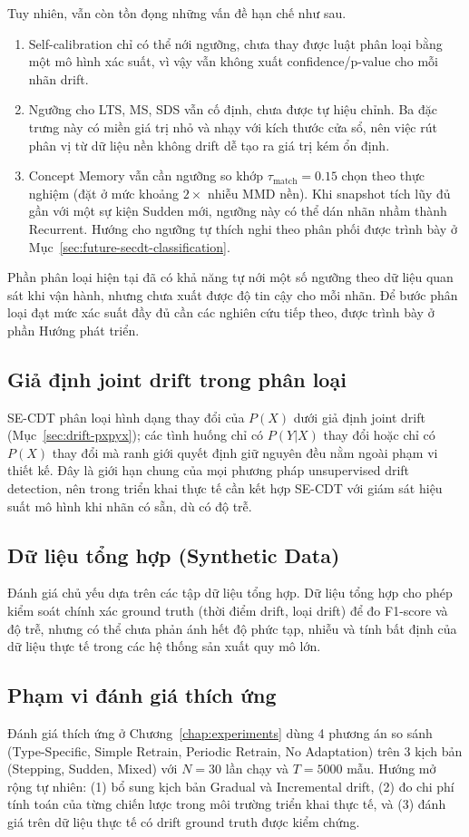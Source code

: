 Tuy nhiên, vẫn còn tồn đọng những vấn đề hạn chế như sau.
\begin{enumerate}
	\item Self-calibration chỉ có thể nới ngưỡng, chưa thay được luật phân loại bằng một mô hình xác suất, vì vậy vẫn không xuất confidence/p-value cho mỗi nhãn drift.
	\item Ngưỡng cho LTS, MS, SDS vẫn cố định, chưa được tự hiệu chỉnh. Ba đặc trưng này có miền giá trị nhỏ và nhạy với kích thước cửa sổ, nên việc rút phân vị từ dữ liệu nền không drift dễ tạo ra giá trị kém ổn định.
	\item Concept Memory vẫn cần ngưỡng so khớp $\tau_{\text{match}} = 0.15$ chọn theo thực nghiệm (đặt ở mức khoảng $2\times$ nhiễu MMD nền). Khi snapshot tích lũy đủ gần với một sự kiện Sudden mới, ngưỡng này có thể dán nhãn nhầm thành Recurrent. Hướng cho ngưỡng tự thích nghi theo phân phối được trình bày ở Mục~\ref{sec:future-secdt-classification}.
\end{enumerate}
Phần phân loại hiện tại đã có khả năng tự nới một số ngưỡng theo dữ liệu quan sát khi vận hành, nhưng chưa xuất được độ tin cậy cho mỗi nhãn. Để bước phân loại đạt mức xác suất đầy đủ cần các nghiên cứu tiếp theo, được trình bày ở phần Hướng phát triển.

\subsection{Giả định joint drift trong phân loại}
\label{sec:limitation-joint-drift}
SE-CDT phân loại hình dạng thay đổi của $P(X)$ dưới giả định joint drift (Mục~\ref{sec:drift-pxpyx}); các tình huống chỉ có $P(Y|X)$ thay đổi hoặc chỉ có $P(X)$ thay đổi mà ranh giới quyết định giữ nguyên đều nằm ngoài phạm vi thiết kế. Đây là giới hạn chung của mọi phương pháp unsupervised drift detection, nên trong triển khai thực tế cần kết hợp SE-CDT với giám sát hiệu suất mô hình khi nhãn có sẵn, dù có độ trễ.

\subsection{Dữ liệu tổng hợp (Synthetic Data)}
Đánh giá chủ yếu dựa trên các tập dữ liệu tổng hợp. Dữ liệu tổng hợp cho phép kiểm soát chính xác ground truth (thời điểm drift, loại drift) để đo F1-score và độ trễ, nhưng có thể chưa phản ánh hết độ phức tạp, nhiễu và tính bất định của dữ liệu thực tế trong các hệ thống sản xuất quy mô lớn.

\subsection{Phạm vi đánh giá thích ứng}
Đánh giá thích ứng ở Chương~\ref{chap:experiments} dùng 4 phương án so sánh (Type-Specific, Simple Retrain, Periodic Retrain, No Adaptation) trên 3 kịch bản (Stepping, Sudden, Mixed) với $N = 30$ lần chạy và $T = 5000$ mẫu. Hướng mở rộng tự nhiên: (1) bổ sung kịch bản Gradual và Incremental drift, (2) đo chi phí tính toán của từng chiến lược trong môi trường triển khai thực tế, và (3) đánh giá trên dữ liệu thực tế có drift ground truth được kiểm chứng.

